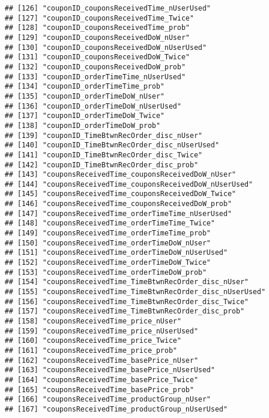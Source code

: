\documentclass[10pt]{report}
\begin{document}
\begin{verbatim}
## [126] "couponID_couponsReceivedTime_nUserUsed"             
## [127] "couponID_couponsReceivedTime_Twice"                 
## [128] "couponID_couponsReceivedTime_prob"                  
## [129] "couponID_couponsReceivedDoW_nUser"                  
## [130] "couponID_couponsReceivedDoW_nUserUsed"              
## [131] "couponID_couponsReceivedDoW_Twice"                  
## [132] "couponID_couponsReceivedDoW_prob"                   
## [133] "couponID_orderTimeTime_nUserUsed"                   
## [134] "couponID_orderTimeTime_prob"                        
## [135] "couponID_orderTimeDoW_nUser"                        
## [136] "couponID_orderTimeDoW_nUserUsed"                    
## [137] "couponID_orderTimeDoW_Twice"                        
## [138] "couponID_orderTimeDoW_prob"                         
## [139] "couponID_TimeBtwnRecOrder_disc_nUser"               
## [140] "couponID_TimeBtwnRecOrder_disc_nUserUsed"           
## [141] "couponID_TimeBtwnRecOrder_disc_Twice"               
## [142] "couponID_TimeBtwnRecOrder_disc_prob"                
## [143] "couponsReceivedTime_couponsReceivedDoW_nUser"       
## [144] "couponsReceivedTime_couponsReceivedDoW_nUserUsed"   
## [145] "couponsReceivedTime_couponsReceivedDoW_Twice"       
## [146] "couponsReceivedTime_couponsReceivedDoW_prob"        
## [147] "couponsReceivedTime_orderTimeTime_nUserUsed"        
## [148] "couponsReceivedTime_orderTimeTime_Twice"            
## [149] "couponsReceivedTime_orderTimeTime_prob"             
## [150] "couponsReceivedTime_orderTimeDoW_nUser"             
## [151] "couponsReceivedTime_orderTimeDoW_nUserUsed"         
## [152] "couponsReceivedTime_orderTimeDoW_Twice"             
## [153] "couponsReceivedTime_orderTimeDoW_prob"              
## [154] "couponsReceivedTime_TimeBtwnRecOrder_disc_nUser"    
## [155] "couponsReceivedTime_TimeBtwnRecOrder_disc_nUserUsed"
## [156] "couponsReceivedTime_TimeBtwnRecOrder_disc_Twice"    
## [157] "couponsReceivedTime_TimeBtwnRecOrder_disc_prob"     
## [158] "couponsReceivedTime_price_nUser"                    
## [159] "couponsReceivedTime_price_nUserUsed"                
## [160] "couponsReceivedTime_price_Twice"                    
## [161] "couponsReceivedTime_price_prob"                     
## [162] "couponsReceivedTime_basePrice_nUser"                
## [163] "couponsReceivedTime_basePrice_nUserUsed"            
## [164] "couponsReceivedTime_basePrice_Twice"                
## [165] "couponsReceivedTime_basePrice_prob"                 
## [166] "couponsReceivedTime_productGroup_nUser"             
## [167] "couponsReceivedTime_productGroup_nUserUsed"         

\end{verbatim}
\end{document}
